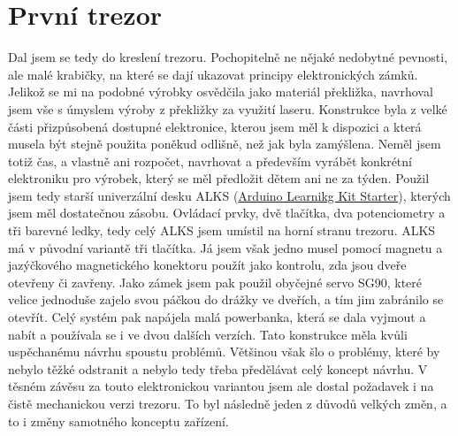 \section{První trezor}

Dal jsem se tedy do kreslení trezoru. Pochopitelně ne nějaké nedobytné pevnosti, ale malé
krabičky,   %
na které se dají ukazovat principy elektronických zámků. Jelikož se mi na podobné
výrobky osvědčila jako materiál překližka, navrhoval jsem vše s úmyslem výroby z překližky 
za využití laseru. Konstrukce byla z velké části přizpůsobená dostupné elektronice, kterou 
jsem měl k dispozici a která musela být stejně použita poněkud odlišně, než jak byla zamýšlena. %
Neměl jsem totiž čas, a vlastně ani rozpočet, navrhovat a především vyrábět konkrétní elektroniku
pro výrobek, který se měl předložit dětem ani ne za týden. %
Použil jsem tedy starší univerzální 
desku ALKS (\href{https://github.com/RoboticsBrno/ArduinoLearningKitStarter}{Arduino Learnikg Kit Starter}), 
kterých jsem měl dostatečnou zásobu. Ovládací prvky, %
dvě tlačítka, dva potenciometry a tři
barevné ledky, tedy celý ALKS jsem umístil na horní stranu trezoru. ALKS má v původní variantě
tři tlačítka. Já jsem však jedno musel pomocí magnetu a jazýčkového magnetického konektoru použít
jako kontrolu, zda jsou dveře otevřeny či zavřeny. Jako zámek jsem pak použil obyčejné servo
SG90, které velice jednoduše zajelo svou páčkou do drážky ve dveřích, a tím jim zabránilo 
se otevřít. Celý systém pak napájela malá powerbanka, která se dala vyjmout a nabít  
a používala se i ve dvou dalších verzích. Tato konstrukce měla kvůli uspěchanému návrhu 
spoustu problémů. Většinou však šlo o problémy, které by nebylo těžké odstranit a nebylo
tedy třeba předělávat celý koncept návrhu. V těsném závěsu za touto elektronickou variantou
jsem ale dostal požadavek i na čistě mechanickou verzi trezoru. To byl následně jeden z 
 důvodů velkých změn, a to i změny samotného konceptu zařízení.

\newpage
